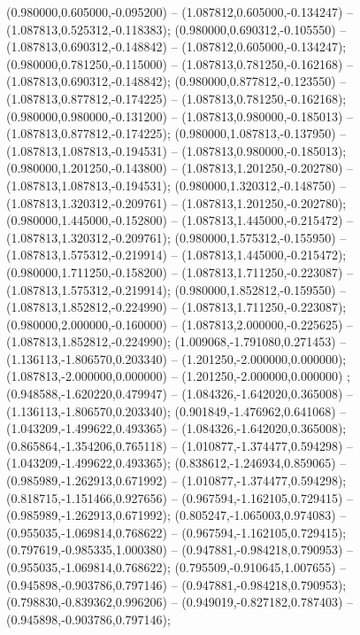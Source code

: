  (0.980000,0.605000,-0.095200) -- (1.087812,0.605000,-0.134247) -- (1.087813,0.525312,-0.118383);
 (0.980000,0.690312,-0.105550) -- (1.087813,0.690312,-0.148842) -- (1.087812,0.605000,-0.134247);
 (0.980000,0.781250,-0.115000) -- (1.087813,0.781250,-0.162168) -- (1.087813,0.690312,-0.148842);
 (0.980000,0.877812,-0.123550) -- (1.087813,0.877812,-0.174225) -- (1.087813,0.781250,-0.162168);
 (0.980000,0.980000,-0.131200) -- (1.087813,0.980000,-0.185013) -- (1.087813,0.877812,-0.174225);
 (0.980000,1.087813,-0.137950) -- (1.087813,1.087813,-0.194531) -- (1.087813,0.980000,-0.185013);
 (0.980000,1.201250,-0.143800) -- (1.087813,1.201250,-0.202780) -- (1.087813,1.087813,-0.194531);
 (0.980000,1.320312,-0.148750) -- (1.087813,1.320312,-0.209761) -- (1.087813,1.201250,-0.202780);
 (0.980000,1.445000,-0.152800) -- (1.087813,1.445000,-0.215472) -- (1.087813,1.320312,-0.209761);
 (0.980000,1.575312,-0.155950) -- (1.087813,1.575312,-0.219914) -- (1.087813,1.445000,-0.215472);
 (0.980000,1.711250,-0.158200) -- (1.087813,1.711250,-0.223087) -- (1.087813,1.575312,-0.219914);
 (0.980000,1.852812,-0.159550) -- (1.087813,1.852812,-0.224990) -- (1.087813,1.711250,-0.223087);
 (0.980000,2.000000,-0.160000) -- (1.087813,2.000000,-0.225625) -- (1.087813,1.852812,-0.224990);
 (1.009068,-1.791080,0.271453) -- (1.136113,-1.806570,0.203340) -- (1.201250,-2.000000,0.000000);
 (1.087813,-2.000000,0.000000) -- (1.201250,-2.000000,0.000000) ;
 (0.948588,-1.620220,0.479947) -- (1.084326,-1.642020,0.365008) -- (1.136113,-1.806570,0.203340);
 (0.901849,-1.476962,0.641068) -- (1.043209,-1.499622,0.493365) -- (1.084326,-1.642020,0.365008);
 (0.865864,-1.354206,0.765118) -- (1.010877,-1.374477,0.594298) -- (1.043209,-1.499622,0.493365);
 (0.838612,-1.246934,0.859065) -- (0.985989,-1.262913,0.671992) -- (1.010877,-1.374477,0.594298);
 (0.818715,-1.151466,0.927656) -- (0.967594,-1.162105,0.729415) -- (0.985989,-1.262913,0.671992);
 (0.805247,-1.065003,0.974083) -- (0.955035,-1.069814,0.768622) -- (0.967594,-1.162105,0.729415);
 (0.797619,-0.985335,1.000380) -- (0.947881,-0.984218,0.790953) -- (0.955035,-1.069814,0.768622);
 (0.795509,-0.910645,1.007655) -- (0.945898,-0.903786,0.797146) -- (0.947881,-0.984218,0.790953);
 (0.798830,-0.839362,0.996206) -- (0.949019,-0.827182,0.787403) -- (0.945898,-0.903786,0.797146);
